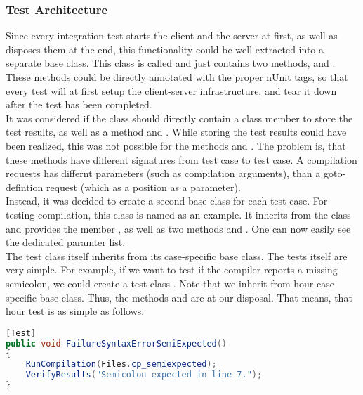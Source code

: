 \subsubsection{Test Architecture}
Since every integration test starts the client and the server at first, as well as disposes them at the end, this functionality could be well extracted into a separate base class.
This class is called  and just contains two methods,  and .
These methods could be directly annotated with the proper nUnit tags, so that every test will at first setup the client-server infrastructure, and tear it down after the test has been completed.\\
It was considered if the  class should directly contain a class member\linebreak {} to store the test results, as well as a method  and . While storing the test results could have been realized, this was not possible for the methods  and . The problem is, that these methods have different signatures from test case to test case. A compilation requests has differnt parameters (such as compilation arguments), than a goto-defintion request (which as a position as a parameter).\\
Instead, it was decided to create a second base class for each test case.
For testing compilation, this class is named  as an example.
It inherits from the  class and provides the member , as well as two methods  and . One can now easily see the dedicated paramter list.\\
The test class itself inherits from its case-specific base class.
The tests itself are very simple.
For example, if we want to test if the compiler reports a missing semicolon, we could create a test class .
Note that we inherit from hour case-specific base class.
Thus, the methods  and are at our disposal.
That means, that hour test is as simple as follows:

\begin{lstlisting}[language=csharp, caption={Sample Test for Missing Semicolon}, captionpos=b, label={lst:demoTest}]
[Test]
public void FailureSyntaxErrorSemiExpected()
{
    RunCompilation(Files.cp_semiexpected);
    VerifyResults("Semicolon expected in line 7.");
}
\end{lstlisting}


